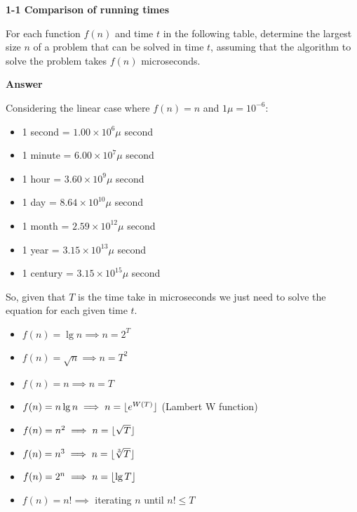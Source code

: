 \documentclass[11pt, oneside]{article}          %
\DeclarePairedDelimiter{\floor}{\lfloor}{\rfloor}
\begin{document}

\textbf{1-1 Comparison of running times}

For each function $f(n)$ and time $t$ in the following table, determine the largest size $n$ of a problem that can be solved in time $t$, assuming that the algorithm to solve the problem takes $f(n)$ microseconds.

\textbf{Answer}

Considering the linear case where $f(n) = n$ and $1\mu = 10^{-6}$:

\begin{itemize}[label=,noitemsep]
  \item 1 second  = $1.00 \times 10^6\mu$ second
  \item 1 minute  = $6.00 \times 10^7\mu$ second
  \item 1 hour    = $3.60 \times 10^9\mu$ second
  \item 1 day     = $8.64 \times 10^{10}\mu$ second
  \item 1 month   = $2.59 \times 10^{12}\mu$ second
  \item 1 year    = $3.15 \times 10^{13}\mu$ second
  \item 1 century = $3.15 \times 10^{15}\mu$ second
\end{itemize}

So, given that $T$ is the time take in microseconds we just need to solve the equation for each given time $t$.

\begin{itemize}[label=,noitemsep]
  \item $f(n) = \lg n   \implies n = 2^{T}$
  \item $f(n) = \sqrt n \implies n = T^2$
  \item $f(n) = n       \implies n = T$
  \item $f(n) = n \lg n \implies n = \floor{e^{W(T)}}$ (Lambert W function)
  \item $f(n) = n^2     \implies n = \floor{\sqrt T}$
  \item $f(n) = n^3     \implies n = \floor{\sqrt[3] T}$
  \item $f(n) = 2^n     \implies n = \floor{\lg T}$
  \item $f(n) = n!      \implies $ iterating $n$ until $n! \leq T$
\end{itemize}
\end{document}
